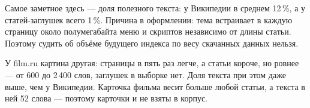 Самое заметное здесь --- доля полезного текста: у Википедии в среднем 12\,\%, а у
статей-заглушек всего 1\,\%. Причина в оформлении: тема встраивает в каждую страницу
около полумегабайта меню и скриптов независимо от длины статьи. Поэтому судить об объёме
будущего индекса по весу скачанных данных нельзя.

У film.ru картина другая: страницы в пять раз легче, а статьи короче, но ровнее ---
от 600 до 2\,400 слов, заглушек в выборке нет. Доля текста при этом даже выше, чем у Википедии.
Карточка фильма весит больше любой статьи, а текста в ней 52 слова --- поэтому
карточки и не взяты в корпус.

\pagebreak
